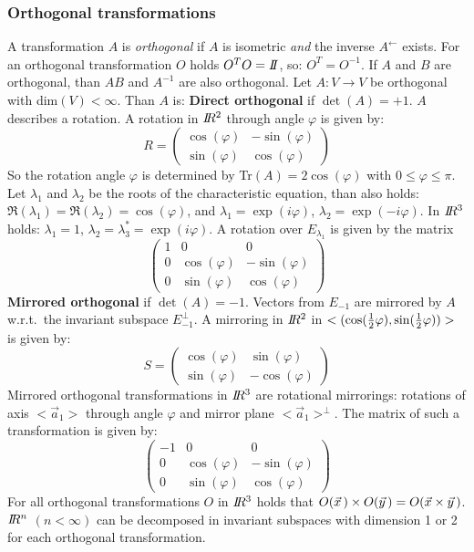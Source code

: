 \documentclass[a4paper,fancyheadings,twoside]{report}
\begin{document}
\subsubsection{Orthogonal transformations}
A transformation $A$ is {\it orthogonal} if $A$ is isometric {\it and}
the inverse $A^\leftarrow$ exists. For an orthogonal transformation $O$ holds
$O^TO=I\hspace{-1mm}I$, so: $O^T=O^{-1}$. If $A$ and $B$ are orthogonal, than $AB$ and
$A^{-1}$ are also orthogonal.
\npar
Let $A:V\rightarrow V$ be orthogonal with dim$(V)<\infty$. Than $A$ is:
\npar
{\bf Direct orthogonal} if $\det(A)=+1$. $A$ describes a rotation.
A rotation in $I\hspace{-1mm}R^2$ through angle $\varphi$ is given by:
\[
R=
\left(\begin{array}{cc}
\cos(\varphi)&-\sin(\varphi)\\
\sin(\varphi)&\cos(\varphi)
\end{array}\right)
\]
So the rotation angle $\varphi$ is determined by Tr$(A)=2\cos(\varphi)$
with $0\leq\varphi\leq\pi$. Let $\lambda_1$ and $\lambda_2$ be the roots of
the characteristic equation, than also holds:
$\Re(\lambda_1)=\Re(\lambda_2)=\cos(\varphi)$, and $\lambda_1=\exp(i\varphi)$,
$\lambda_2=\exp(-i\varphi)$.
\npar
In $I\hspace{-1mm}R^3$ holds: $\lambda_1=1$, $\lambda_2=\lambda_3^*=\exp(i\varphi)$. A
rotation over $E_{\lambda_1}$ is given by the matrix
\[
\left(\begin{array}{ccc}
1&0&0\\
0&\cos(\varphi)&-\sin(\varphi)\\
0&\sin(\varphi)&\cos(\varphi)
\end{array}\right)
\]
{\bf Mirrored orthogonal} if $\det(A)=-1$. Vectors from $E_{-1}$ are mirrored
by $A$ w.r.t.\ the invariant subspace $E^\perp_{-1}$. A mirroring in $I\hspace{-1mm}R^2$
in $<(\cos(\mbox{$\frac{1}{2}$}\varphi),\sin(\mbox{$\frac{1}{2}$}\varphi))>$ is given by:
\[
S=
\left(\begin{array}{cc}
\cos(\varphi)&\sin(\varphi)\\
\sin(\varphi)&-\cos(\varphi)
\end{array}\right)
\]
Mirrored orthogonal transformations in $I\hspace{-1mm}R^3$ are rotational mirrorings:
rotations of axis $<\vec{a}_1>$ through angle $\varphi$ and mirror plane
$<\vec{a}_1>^\perp$. The matrix of such a transformation is given by:
\[
\left(\begin{array}{ccc}
-1&0&0\\
0&\cos(\varphi)&-\sin(\varphi)\\
0&\sin(\varphi)&\cos(\varphi)
\end{array}\right)
\]
For all orthogonal transformations $O$ in $I\hspace{-1mm}R^3$ holds that
$O(\vec{x}\,)\times O(\vec{y}\,)=O(\vec{x}\times\vec{y}\,)$.
\npar
$I\hspace{-1mm}R^n$ $(n<\infty)$ can be decomposed in invariant subspaces with dimension
1 or 2 for each orthogonal transformation.
\end{document}
